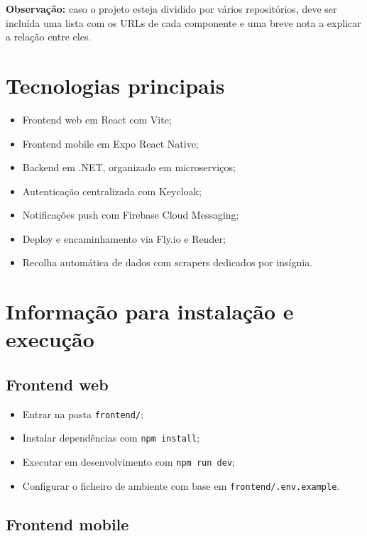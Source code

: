 \documentclass[a4paper,11pt]{article}
\begin{document}
\textbf{Observa\c{c}\~ao:} caso o projeto esteja dividido por v\'arios reposit\'orios, deve ser inclu\'ida uma lista com os URLs de cada componente e uma breve nota a explicar a rela\c{c}\~ao entre eles.

\section{Tecnologias principais}

\begin{itemize}[leftmargin=1.8em]
    \item Frontend web em React com Vite;
    \item Frontend mobile em Expo React Native;
    \item Backend em .NET, organizado em microservi\c{c}os;
    \item Autentica\c{c}\~ao centralizada com Keycloak;
    \item Notifica\c{c}\~oes push com Firebase Cloud Messaging;
    \item Deploy e encaminhamento via Fly.io e Render;
    \item Recolha autom\'atica de dados com scrapers dedicados por ins\'ignia.
\end{itemize}

\section{Informa\c{c}\~ao para instala\c{c}\~ao e execu\c{c}\~ao}

\subsection{Frontend web}

\begin{itemize}[leftmargin=1.8em]
    \item Entrar na pasta \texttt{frontend/};
    \item Instalar depend\^encias com \texttt{npm install};
    \item Executar em desenvolvimento com \texttt{npm run dev};
    \item Configurar o ficheiro de ambiente com base em \texttt{frontend/.env.example}.
\end{itemize}

\subsection{Frontend mobile}
\end{document}
